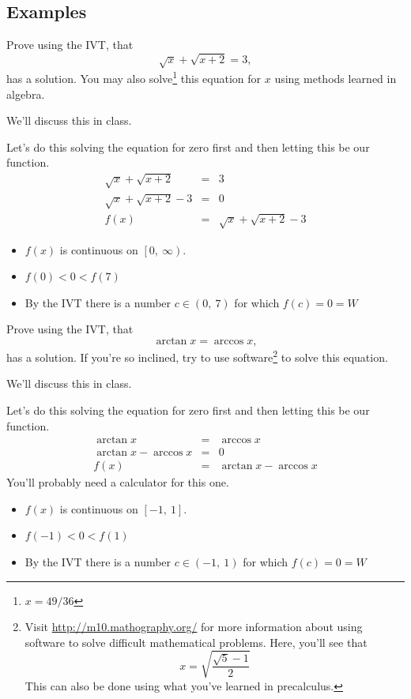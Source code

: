 \documentclass[12pt,addpoints, answers, fleqn]{exam}
\begin{document}
\subsection{Examples}
\begin{questions}
\item Prove using the IVT, that
\[
\sqrt{x} + \sqrt{x+2}=3,
\]
has a solution. You may also solve\footnote{$x=49/36$} this equation for $x$ using methods learned in  algebra.

\begin{solution}
We'll discuss this in class.

Let's do this solving the equation for zero first and then letting this be our function.
\begin{eqnarray*}
\sqrt{x} + \sqrt{x+2}&=&3\\
\sqrt{x} + \sqrt{x+2} - 3 &=&0\\
f\left( x \right) &=& \sqrt{x} + \sqrt{x+2}-3
\end{eqnarray*}
\begin{itemize}
\item $f \left( x \right)$ is continuous on $\left[ 0, \ \infty \right)$.
\item $f \left( 0 \right)  < 0 <  f \left( 7 \right)$
\item By the IVT there is a number $c \in \left( 0, \ 7 \right)$ for which $f \left(c\right) = 0 = W$
\end{itemize}
\end{solution}



\question Prove using the IVT, that
\[
\arctan x = \arccos x,
\]
has a solution. If you're so inclined, try to use software\footnote{Visit \url{http://m10.mathography.org/} for more information about using software to solve difficult mathematical problems. Here, you'll see that
\[
x= \sqrt{\frac{\sqrt{5}-1}{2}}
\]
This can also be done using what you've learned in precalculus.} to solve this equation.

\begin{solution}
We'll discuss this in class.

Let's do this solving the equation for zero first and then letting this be our function.
\begin{eqnarray*}
\arctan x &=& \arccos x\\
\arctan x - \arccos x &=&0\\
f\left( x \right) &=& \arctan x - \arccos x
\end{eqnarray*}
You'll probably need a calculator for this one.
\begin{itemize}
\item $f \left( x \right)$ is continuous on $\left[ -1, \ 1 \right]$.
\item $f \left( -1 \right)  < 0 <  f \left( 1 \right)$
\item By the IVT there is a number $c \in \left( -1, \ 1 \right)$ for which $f \left(c\right) = 0 = W$
\end{itemize}
\end{solution}


\end{questions}
\end{document}
